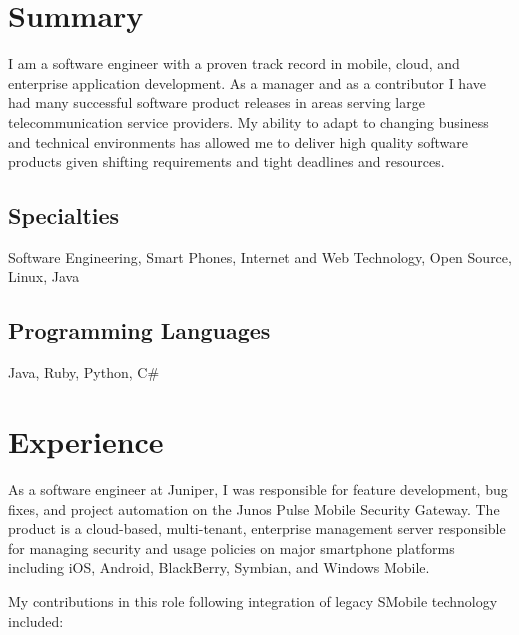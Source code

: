 \documentclass{moderncv}
\begin{document}
\makecvtitle

\section{Summary}

I am a software engineer with a proven track record in mobile, cloud, and
enterprise application development. As a manager and as a contributor I have
had many successful software product releases in areas serving large
telecommunication service providers. My ability to adapt to changing business
and technical environments has allowed me to deliver high quality software
products given shifting requirements and tight deadlines and resources.

\subsection{Specialties}

Software Engineering, Smart Phones, Internet and Web Technology, Open Source, Linux, Java

\subsection{Programming Languages}

Java, Ruby, Python, C\#

\section{Experience}


As a software engineer at Juniper, I was responsible for feature development,
bug fixes, and project automation on the Junos Pulse Mobile Security Gateway.
The product is a cloud-based, multi-tenant, enterprise management server
responsible for managing security and usage policies on major smartphone
platforms including iOS, Android, BlackBerry, Symbian, and Windows Mobile.

My contributions in this role following integration of legacy SMobile technology
included:
\end{document}

